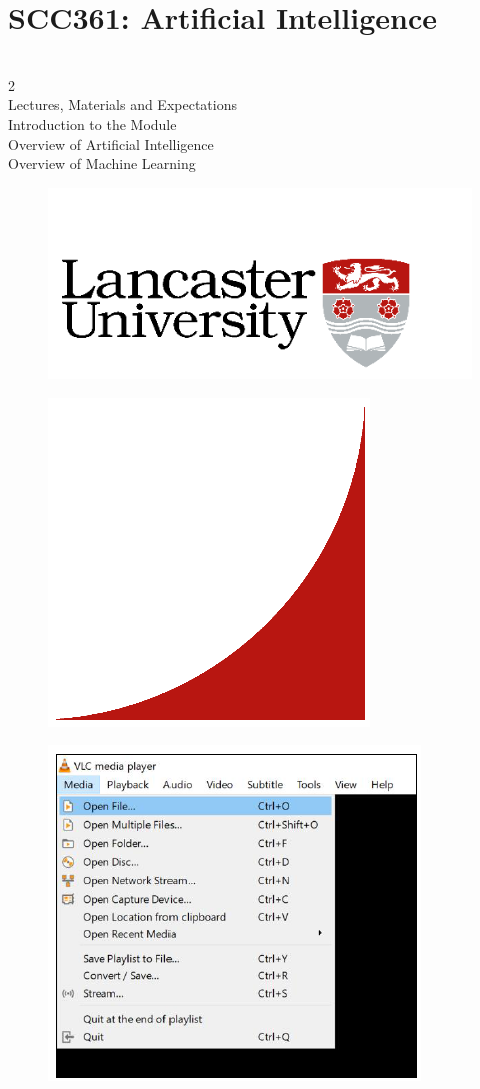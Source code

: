 \documentclass[12pt]{article}
\begin{document}
\section{SCC361: Artificial Intelligence}
\\
2\\
Lectures, Materials and Expectations\\
Introduction to the Module\\
Overview of Artificial Intelligence\\
Overview of Machine Learning\\
\begin{figure}[H]
\includegraphics[width=0.5\linewidth]{page1-image-1.png}
\end{figure}
\begin{figure}[H]
\includegraphics[width=0.5\linewidth]{page1-image-2.png}
\end{figure}
\begin{figure}[H]
\includegraphics[width=0.5\linewidth]{page1-image-3.png}
\end{figure}
\end{document}
